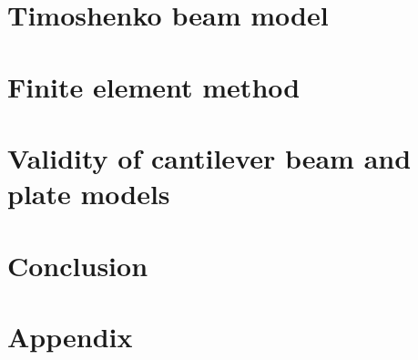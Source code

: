 \documentclass[12pt]{report}
\begin{document}
\chapter{Timoshenko beam model}







\chapter{Finite element method}




\chapter{Validity of cantilever beam and plate models}




\chapter{Conclusion}


\printbibliography

\chapter*{Appendix}


\end{document}
